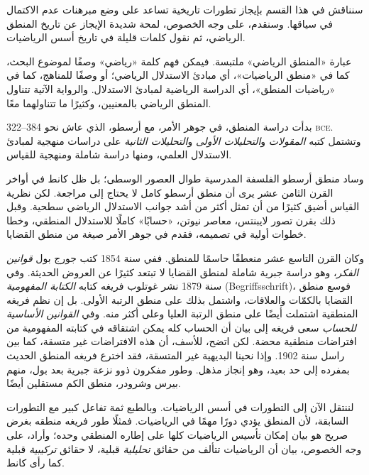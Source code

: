 \documentclass[../../../include/open-logic-section]{subfiles}
\begin{document}


سنناقش في هذا القسم بإيجاز تطورات تاريخية تساعد على وضع مبرهنات عدم
الاكتمال في سياقها. وسنقدم، على وجه الخصوص، لمحة شديدة الإيجاز عن
تاريخ المنطق الرياضي، ثم نقول كلمات قليلة في تاريخ أسس الرياضيات.

\begin{digress}
  عبارة «المنطق الرياضي» ملتبسة. فيمكن فهم كلمة «رياضي» وصفًا لموضوع
  البحث، كما في «منطق الرياضيات»، أي مبادئ الاستدلال الرياضي؛ أو
  وصفًا للمناهج، كما في «رياضيات المنطق»، أي الدراسة الرياضية لمبادئ
  الاستدلال. والرواية الآتية تتناول المنطق الرياضي بالمعنيين، وكثيرًا
  ما تتناولهما معًا.
\end{digress}

بدأت دراسة المنطق، في جوهر الأمر، مع أرسطو، الذي عاش نحو 384--322
\textsc{bce}. وتشتمل كتبه \emph{المقولات} و\emph{التحليلات الأولى}
و\emph{التحليلات الثانية} على دراسات منهجية لمبادئ الاستدلال العلمي،
ومنها دراسة شاملة ومنهجية للقياس.

وساد منطق أرسطو الفلسفة المدرسية طوال العصور الوسطى؛ بل ظل كانط في
أواخر القرن الثامن عشر يرى أن منطق أرسطو كامل لا يحتاج إلى مراجعة.
لكن نظرية القياس أضيق كثيرًا من أن تمثل أكثر من أشد جوانب الاستدلال
الرياضي سطحية. وقبل ذلك بقرن تصور لايبنتس، معاصر نيوتن، «حسابًا» كاملًا
للاستدلال المنطقي، وخطا خطوات أولية في تصميمه، فقدم في جوهر الأمر
صيغة من منطق القضايا.

وكان القرن التاسع عشر منعطفًا حاسمًا للمنطق. ففي سنة 1854 كتب جورج
بول \emph{قوانين الفكر}، وهو دراسة جبرية شاملة لمنطق القضايا لا تبتعد
كثيرًا عن العروض الحديثة. وفي سنة 1879 نشر غوتلوب فريغه كتابه
\emph{الكتابة المفهومية} (Begriffsschrift)، فوسع منطق القضايا
بالكمّات والعلاقات، واشتمل بذلك على منطق الرتبة الأولى. بل إن نظم
فريغه المنطقية اشتملت أيضًا على منطق الرتبة العليا وعلى أكثر منه. وفي
\emph{القوانين الأساسية للحساب} سعى فريغه إلى بيان أن الحساب كله
يمكن اشتقاقه في كتابته المفهومية من افتراضات منطقية محضة. لكن اتضح،
للأسف، أن هذه الافتراضات غير متسقة، كما بين راسل سنة 1902. وإذا
نحينا البديهية غير المتسقة، فقد اخترع فريغه المنطق الحديث بمفرده إلى
حد بعيد، وهو إنجاز مذهل. وطور مفكرون ذوو نزعة جبرية بعد بول، منهم
بيرس وشرودر، منطق الكم مستقلين أيضًا.

لننتقل الآن إلى التطورات في أسس الرياضيات. وبالطبع ثمة تفاعل كبير
مع التطورات السابقة، لأن المنطق يؤدي دورًا مهمًا في الرياضيات. فمثلًا
طور فريغه منطقه بغرض صريح هو بيان إمكان تأسيس الرياضيات كلها على
إطاره المنطقي وحده؛ وأراد، على وجه الخصوص، بيان أن الرياضيات تتألف من
حقائق \emph{تحليلية} قبلية، لا حقائق \emph{تركيبية} قبلية كما رأى
كانط.
\end{document}
